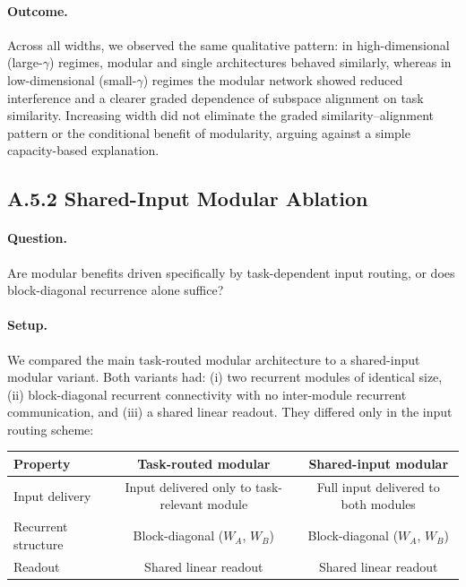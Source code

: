 \documentclass{article}
\theoremstyle{plain}
\theoremstyle{definition}
\theoremstyle{remark}
\begin{document}
\paragraph{Outcome.}
Across all widths, we observed the same qualitative pattern: in high-dimensional (large-$\gamma$) regimes, modular and single architectures behaved similarly, whereas in low-dimensional (small-$\gamma$) regimes the modular network showed reduced interference and a clearer graded dependence of subspace alignment on task similarity. Increasing width did not eliminate the graded similarity–alignment pattern or the conditional benefit of modularity, arguing against a simple capacity-based explanation.

\subsection{A.5.2 Shared-Input Modular Ablation}

\paragraph{Question.}
Are modular benefits driven specifically by task-dependent input routing, or does block-diagonal recurrence alone suffice?

\paragraph{Setup.}
We compared the main task-routed modular architecture to a shared-input modular variant.
Both variants had:
(i) two recurrent modules of identical size,
(ii) block-diagonal recurrent connectivity with no inter-module recurrent communication,
and (iii) a shared linear readout.
They differed only in the input routing scheme:

\begin{center}
\begin{tabular}{lcc}
\toprule
Property & Task-routed modular & Shared-input modular \\
\midrule
Input delivery & Input delivered only to task-relevant module & Full input delivered to both modules \\
Recurrent structure & Block-diagonal ($W_A$, $W_B$) & Block-diagonal ($W_A$, $W_B$) \\
Readout & Shared linear readout & Shared linear readout \\
\bottomrule
\end{tabular}
\end{center}
\end{document}
